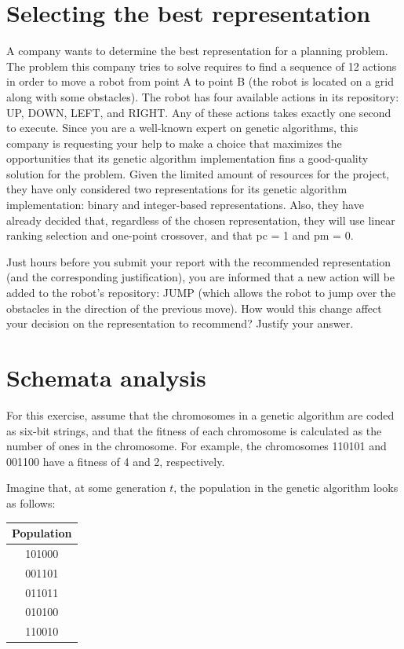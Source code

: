 \documentclass{article}
\begin{document}
\section{Selecting the best representation}
A company wants to determine the best representation for a planning problem. The problem this company tries to solve requires to find a sequence of 12 actions in order to move a robot from point A to point
B (the robot is located on a grid along with some obstacles). The robot has four available actions in its repository: UP, DOWN, LEFT, and RIGHT. Any of these actions takes exactly one second to execute. Since you are a well-known expert on genetic algorithms, this company is requesting your help to make a choice that maximizes the opportunities that its genetic algorithm implementation fins a good-quality solution for the problem. Given the limited amount of resources for the project, they have only considered two representations for its genetic algorithm implementation: binary and integer-based representations. Also, they have already decided that, regardless of the chosen representation, they will use linear ranking selection and one-point crossover, and that pc = 1 and pm = 0.

Just hours before you submit your report with the recommended representation (and the corresponding justification), you are informed that a new action will be added to the robot’s repository: JUMP (which allows the robot to jump over the obstacles in the direction of the previous move). How would this change affect your decision on the representation to recommend? Justify your answer.

\section{Schemata analysis}
For this exercise, assume that the chromosomes in a genetic algorithm are coded as six-bit strings, and that the fitness of each chromosome is calculated as the number of ones in the chromosome. For example, the
chromosomes 110101 and 001100 have a fitness of 4 and 2, respectively.

Imagine that, at some generation $t$, the population in the genetic algorithm looks as follows:

\begin{table}[h]
    \centering
    \begin{tabular}{c}
        \hline
        Population  \\
        \hline
        101000\\
        001101\\
        011011\\
        010100\\
        110010\\
        \hline
    \end{tabular}
\end{table}
\end{document}
